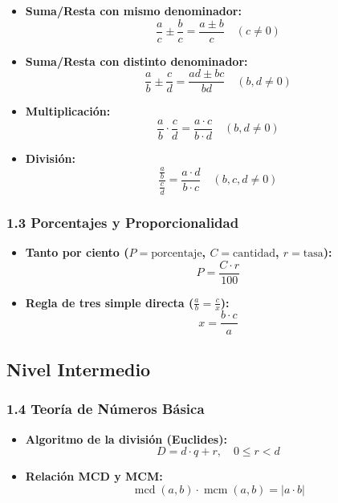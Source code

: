 \documentclass[11pt,a4paper]{article}
\begin{document}
\begin{itemize}
  \item \textbf{Suma/Resta con mismo denominador:}
  \[
    \frac{a}{c} \pm \frac{b}{c} = \frac{a \pm b}{c} \quad (c \ne 0)
  \]
  \item \textbf{Suma/Resta con distinto denominador:}
  \[
    \frac{a}{b} \pm \frac{c}{d} = \frac{ad \pm bc}{bd} \quad (b, d \ne 0)
  \]
  \item \textbf{Multiplicación:}
  \[
    \frac{a}{b} \cdot \frac{c}{d} = \frac{a \cdot c}{b \cdot d} \quad (b, d \ne 0)
  \]
  \item \textbf{División:}
  \[
    \frac{\frac{a}{b}}{\frac{c}{d}} = \frac{a \cdot d}{b \cdot c} \quad (b, c, d \ne 0)
  \]
\end{itemize}

\subsubsection*{1.3 Porcentajes y Proporcionalidad}

\begin{itemize}
  \item \textbf{Tanto por ciento ($P = \text{porcentaje}$, $C = \text{cantidad}$, $r = \text{tasa}$):}
  \[
    P = \frac{C \cdot r}{100}
  \]
  \item \textbf{Regla de tres simple directa ($\frac{a}{b} = \frac{c}{x}$):}
  \[
    x = \frac{b \cdot c}{a}
  \]
\end{itemize}

\subsection*{Nivel Intermedio}

\subsubsection*{1.4 Teoría de Números Básica}

\begin{itemize}
  \item \textbf{Algoritmo de la división (Euclides):}
  \[
    D = d \cdot q + r, \quad 0 \le r < d
  \]
  \item \textbf{Relación MCD y MCM:}
  \[
    \operatorname{mcd}(a, b) \cdot \operatorname{mcm}(a, b) = |a \cdot b|
  \]
\end{itemize}
\end{document}
